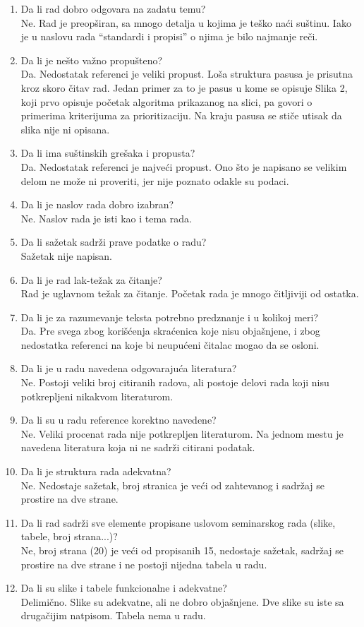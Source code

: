\documentclass[a4paper]{report}
\begin{document}
\begin{enumerate}
\item Da li rad dobro odgovara na zadatu temu?\\
  Ne. Rad je preopširan, sa mnogo detalja u kojima je teško naći suštinu. Iako je u naslovu rada ``standardi i propisi'' o njima je bilo najmanje reči.
\item Da li je nešto važno propušteno?\\
  Da. Nedostatak referenci je veliki propust. Loša struktura pasusa je prisutna kroz skoro čitav rad. Jedan primer za to je pasus u kome se opisuje Slika 2, koji prvo opisuje početak algoritma prikazanog na slici, pa govori o primerima kriterijuma za prioritizaciju. Na kraju pasusa se stiče utisak da slika nije ni opisana.
\item Da li ima suštinskih grešaka i propusta?\\
  Da. Nedostatak referenci je najveći propust. Ono što je napisano se velikim delom ne može ni proveriti, jer nije poznato odakle su podaci.
\item Da li je naslov rada dobro izabran?\\
  Ne. Naslov rada je isti kao i tema rada.
\item Da li sažetak sadrži prave podatke o radu?\\
  Sažetak nije napisan.
\item Da li je rad lak-težak za čitanje?\\
  Rad je uglavnom težak za čitanje. Početak rada je mnogo čitljiviji od ostatka.
\item Da li je za razumevanje teksta potrebno predznanje i u kolikoj meri?\\
  Da. Pre svega zbog korišćenja skraćenica koje nisu objašnjene, i zbog nedostatka referenci na koje bi neupućeni čitalac mogao da se osloni.
\item Da li je u radu navedena odgovarajuća literatura?\\
  Ne. Postoji veliki broj citiranih radova, ali postoje delovi rada koji nisu potkrepljeni nikakvom literaturom.
\item Da li su u radu reference korektno navedene?\\
  Ne. Veliki procenat rada nije potkrepljen literaturom. Na jednom mestu je navedena literatura koja ni ne sadrži citirani podatak.
\item Da li je struktura rada adekvatna?\\
  Ne. Nedostaje sažetak, broj stranica je veći od zahtevanog i sadržaj se prostire na dve strane.
\item Da li rad sadrži sve elemente propisane uslovom seminarskog rada (slike, tabele, broj strana...)?\\
  Ne, broj strana (20) je veći od propisanih 15, nedostaje sažetak, sadržaj se prostire na dve strane i ne postoji nijedna tabela u radu.
\item Da li su slike i tabele funkcionalne i adekvatne?\\
  Delimično. Slike su adekvatne, ali ne dobro objašnjene. Dve slike su iste sa drugačijim natpisom. Tabela nema u radu.
\end{enumerate}
\end{document}
